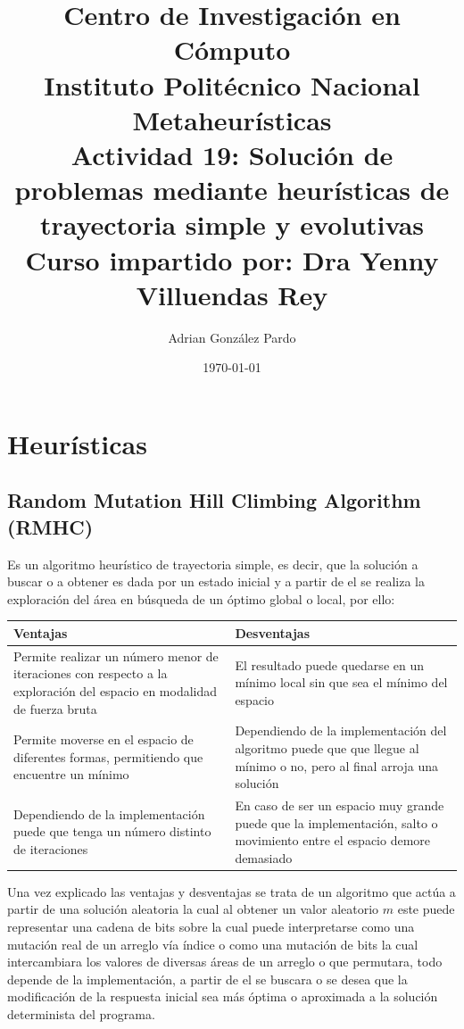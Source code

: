 \documentclass[10pt]{article}
\title{Centro de Investigación en Cómputo\\Instituto Politécnico Nacional\\Metaheurísticas\\Actividad 19: Solución de problemas mediante heurísticas de trayectoria simple y evolutivas\\Curso impartido por: Dra Yenny Villuendas Rey}
\author{Adrian González Pardo}
\date{\today}
\begin{document}
\maketitle
\section{Heurísticas}
\subsection{Random Mutation Hill Climbing Algorithm (RMHC)}
Es un algoritmo heurístico de trayectoria simple, es decir, que la solución a buscar o a obtener es dada por un estado inicial y a partir de el se realiza la exploración del área en búsqueda de un óptimo global o local, por ello:
\begin{center}
  \begin{tabular}{|p{5cm}|p{5cm}|}
    \hline
    Ventajas & Desventajas \\
    \hline
    Permite realizar un número menor de iteraciones con respecto a la exploración del espacio en modalidad de fuerza bruta & El resultado puede quedarse en un mínimo local sin que sea el mínimo del espacio\\
    \hline
    Permite moverse en el espacio de diferentes formas, permitiendo que encuentre un mínimo & Dependiendo de la implementación del algoritmo puede que que llegue al mínimo o no, pero al final arroja una solución \\
    \hline
    Dependiendo de la implementación puede que tenga un número distinto de iteraciones & En caso de ser un espacio muy grande puede que la implementación, salto o movimiento entre el espacio demore demasiado\\
    \hline
  \end{tabular}
\end{center}
Una vez explicado las ventajas y desventajas se trata de un algoritmo que actúa a partir de una solución aleatoria la cual al obtener un valor aleatorio $m$ este puede representar una cadena de bits sobre la cual puede interpretarse como una mutación real de un arreglo vía índice o como una mutación de bits la cual intercambiara los valores de diversas áreas de un arreglo o que permutara, todo depende de la implementación, a partir de el se buscara o se desea que la modificación de la respuesta inicial sea más óptima o aproximada a la solución determinista del programa.
\end{document}
